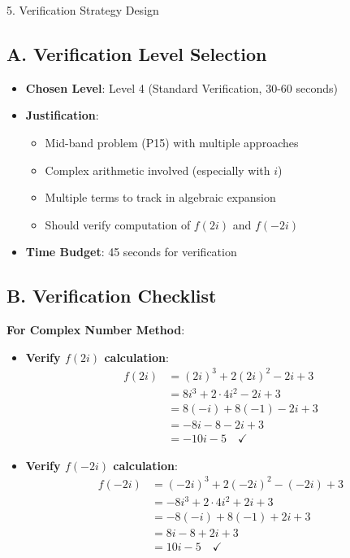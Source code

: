 \documentclass[12pt]{article}
\begin{document}
\begin{verificationbox}{5. Verification Strategy Design}

\subsection*{A. Verification Level Selection}
\begin{itemize}[leftmargin=*]
    \item \textbf{Chosen Level}: Level 4 (Standard Verification, 30-60 seconds)
    
    \item \textbf{Justification}: 
    \begin{itemize}
        \item Mid-band problem (P15) with multiple approaches
        \item Complex arithmetic involved (especially with $i$)
        \item Multiple terms to track in algebraic expansion
        \item Should verify computation of $f(2i)$ and $f(-2i)$
    \end{itemize}
    
    \item \textbf{Time Budget}: 45 seconds for verification
\end{itemize}

\subsection*{B. Verification Checklist}

\textbf{For Complex Number Method}:
\begin{itemize}
    \item \textbf{Verify $f(2i)$ calculation}:
    \begin{align*}
    f(2i) &= (2i)^3 + 2(2i)^2 - 2i + 3\\
    &= 8i^3 + 2 \cdot 4i^2 - 2i + 3\\
    &= 8(-i) + 8(-1) - 2i + 3\\
    &= -8i - 8 - 2i + 3\\
    &= -10i - 5 \quad \checkmark
    \end{align*}
    
    \item \textbf{Verify $f(-2i)$ calculation}:
    \begin{align*}
    f(-2i) &= (-2i)^3 + 2(-2i)^2 - (-2i) + 3\\
    &= -8i^3 + 2 \cdot 4i^2 + 2i + 3\\
    &= -8(-i) + 8(-1) + 2i + 3\\
    &= 8i - 8 + 2i + 3\\
    &= 10i - 5 \quad \checkmark
    \end{align*}
    

\end{itemize}
\end{verificationbox}
\end{document}
